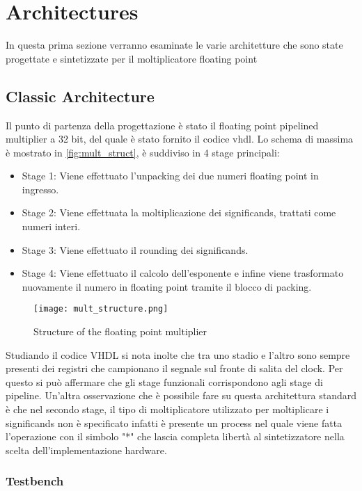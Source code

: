 \section{Architectures}
In questa prima sezione verranno esaminate le varie architetture che sono state progettate e sintetizzate per il moltiplicatore floating point

\subsection{Classic Architecture}
Il punto di partenza della progettazione è stato il floating point pipelined multiplier a 32 bit, del quale è stato fornito il codice vhdl.
Lo schema di massima è mostrato in \autoref{fig:mult_struct}, è suddiviso in 4 stage principali:
\begin{itemize}
\item Stage 1: Viene effettuato l'unpacking dei due numeri floating point in ingresso.
\item Stage 2: Viene effettuata la moltiplicazione dei significands, trattati come numeri interi.
\item Stage 3: Viene effettuato il rounding dei significands.
\item Stage 4: Viene effettuato il calcolo dell'esponente e infine viene trasformato nuovamente il numero in floating point tramite il blocco di packing.
\end{itemize}

\begin{figure}[h]
	\center
	\texttt{[image: mult\_structure.png]}
	\caption{Structure of the floating point multiplier}
	\label{fig:mult_struct}
\end{figure}

\noindent Studiando il codice VHDL si nota inolte che tra uno stadio e l'altro sono sempre presenti dei registri che campionano il segnale sul fronte di salita del clock. Per questo si può affermare che gli stage funzionali corrispondono agli stage di pipeline.
Un'altra osservazione che è possibile fare su questa architettura standard è che nel secondo stage, il tipo di moltiplicatore utilizzato per moltiplicare i significands non è specificato infatti è presente un process nel quale viene fatta l'operazione con il simbolo "*" che lascia completa libertà al sintetizzatore nella scelta dell'implementazione hardware.

\subsubsection{Testbench}

